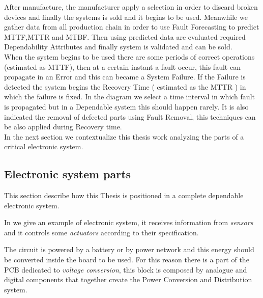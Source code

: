 {{{			After manufacture, the manufacturer apply a selection in order to discard broken devices and finally the systems is sold and it begins to be used.
			Meanwhile we gather data from all production chain in order to use Fault Forecasting to predict MTTF,MTTR and MTBF. Then using predicted data are evaluated required Dependability Attributes and finally system is validated and can be sold.\\
			
			When the system begins to be used there are some periods of correct operations (estimated as MTTF), then at a certain instant a fault occur, this fault can propagate in an Error and this can became a System Failure.
			If the Failure is detected the system begins the Recovery Time ( estimated as the MTTR ) in which the failure is fixed. In the diagram we select a time interval in which fault is propagated but in a Dependable system this should happen rarely. 
			It is also indicated the removal of defected parts using Fault Removal, this techniques can be also applied during Recovery time.  \\
			     
			In the next section we contextualize this thesis work analyzing the parts of a critical electronic system.
		} %
	
		\newpage
		\subsection{Electronic system parts}{
		    \label{ElectronicSystemParts}
			This section describe how this Thesis is positioned in a complete dependable electronic system.
			
			In  we give an example of electronic system, it receives information from \textit{sensors} and it controls some \textit{actuators} according to their specification. 
			
			The circuit is powered by a battery or by power network and this energy should be converted inside the board to be used. For this reason there is a part of the PCB dedicated to \textit{voltage conversion}, this block is composed by analogue and digital components that together create the Power Conversion and Distribution system.
			
}}}
